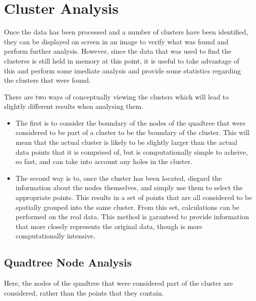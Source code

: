 
\section{Cluster Analysis}
\label{sec:cluster_analysis}

Once the data has been processed and a number of clusters have been identified,
they can be displayed on screen in an image to verify what was found and
perform further analysis. However, since the data that was used to find the
clusteres is still held in memory at this point, it is useful to take advantage
of this and perform some imediate analysis and provide some statistics
regarding the clusters that were found.

There are two ways of conceptually viewing the clusters which will lead to
slightly different results when analysing them.

\begin{itemize}

	\item The first is to consider the boundary of the nodes of the quadtree
		that were considered to be part of a cluster to be the boundary of the
		cluster. This will mean that the actual cluster is likely to be
		slightly larger than the actual data points that it is comprised of,
		but is computationally simple to acheive, so fast, and can take into
		account any holes in the cluster.

	\item The second way is to, once the cluster has been located, disgard the
		information about the nodes themselves, and simply use them to select
		the appropriate points. This results in a set of points that are all
		considered to be spatially grouped into the same cluster. From this
		set, calculations can be performed on the real data. This method is
		garanteed to provide information that more closely represents the
		original data, though is more computationally intensive.

\end{itemize}

\subsection{Quadtree Node Analysis}
\label{sub:quadtree_node_analysis}

Here, the nodes of the quadtree that were considered part of the cluster are
considered, rather than the points that they contain.


